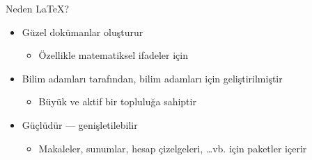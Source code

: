 \documentclass[aspectratio=169]{beamer}
\subtitle{Bölüm 1: Temeller}
\begin{document}
\begin{frame}
\titlepage
\end{frame}

\begin{frame}{Neden \LaTeX{}?}
\begin{itemize}
\item Güzel dokümanlar oluşturur
\begin{itemize}
\item Özellikle matematiksel ifadeler için
\end{itemize}
%
\item Bilim adamları tarafından, bilim adamları için geliştirilmiştir
\begin{itemize}
\item Büyük ve aktif bir topluluğa sahiptir
\end{itemize}
%
\item Güçlüdür --- genişletilebilir
\begin{itemize}
\item Makaleler, sunumlar, hesap çizelgeleri, \ldots vb. için paketler içerir
\end{itemize}
\end{itemize}
\end{frame}
\end{document}
